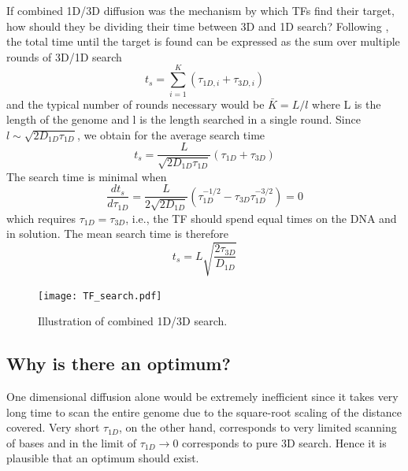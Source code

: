 If combined 1D/3D diffusion was the mechanism by which TFs find their target, how should they be dividing their time between 3D and 1D search?
Following \citep{mirny_how_2009}, the total time until the target is found can be expressed as the sum over multiple rounds of 3D/1D search
\begin{equation}
t_s = \sum_{i=1}^K (\tau_{1D,i} + \tau_{3D,i})
\end{equation}
and the typical number of rounds necessary would be $\bar{K} = L/l $ where L is the length of the genome and l is the length searched in a single round.
Since $l\sim \sqrt{2D_{1D} \tau_{1D}}$, we obtain for the average search time
\begin{equation}
 t_s = \frac{L}{\sqrt{2D_{1D} \tau_{1D}} }(\tau_{1D}+\tau_{3D})
\end{equation}
The search time is minimal when
\begin{equation}
 \frac{d t_s}{d \tau_{1D}} = \frac{L}{2\sqrt{2D_{1D}}}(\tau_{1D}^{-1/2}-\tau_{3D}\tau_{1D}^{-3/2}) = 0
\end{equation}
which requires $\tau_{1D} = \tau_{3D}$, i.e., the TF should spend equal times on the DNA and in solution.
The mean search time is therefore
\begin{equation}
 t_s = L\sqrt{\frac{2\tau_{3D}}{D_{1D}}}
\end{equation}

\begin{figure}[tb]
	\centering
	\texttt{[image: TF\_search.pdf]}
	\caption{Illustration of combined 1D/3D search.}
	\label{fig:TF_search}
\end{figure}

\subsection*{Why is there an optimum?}
One dimensional diffusion alone would be extremely inefficient since it takes very long time to scan the entire genome due to the square-root scaling of the distance covered.
Very short $\tau_{1D}$, on the other hand, corresponds to very limited scanning of bases and in the limit of $\tau_{1D}\to 0$ corresponds to pure 3D search.
Hence it is plausible that an optimum should exist.
